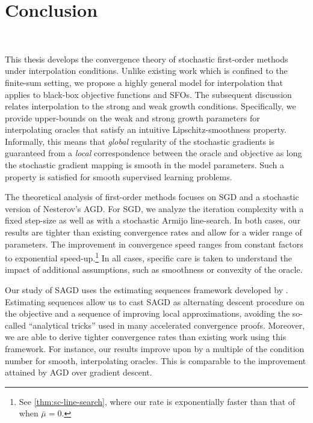 \acresetall 
\chapter{Conclusion}~\label{ch:conclusion}

This thesis develops the convergence theory of stochastic first-order methods under interpolation conditions. 
Unlike existing work which is confined to the finite-sum setting, we propose a highly general model for interpolation that applies to black-box objective functions and \acp{SFO}. 
The subsequent discussion relates interpolation to the strong and weak growth conditions.
Specifically, we provide upper-bounds on the weak and strong growth parameters for interpolating oracles that satisfy an intuitive Lipschitz-smoothness property. 
Informally, this means that \emph{global} regularity of the stochastic gradients is guaranteed from a \emph{local} correspondence between the oracle and objective as long the stochastic gradient mapping is smooth in the model parameters. 
Such a property is satisfied for smooth supervised learning problems. 

The theoretical analysis of first-order methods focuses on \ac{SGD} and a stochastic version of Nesterov's \acl{AGD}. 
For \ac{SGD}, we analyze the iteration complexity with a fixed step-size as well as with a stochastic Armijo line-search.
In both cases, our results are tighter than existing convergence rates and allow for a wider range of parameters.
The improvement in convergence speed ranges from constant factors to exponential speed-up.\footnote{See \autoref{thm:sc-line-search}, where our rate is exponentially faster than that of \citet{vaswani2019painless} when \( \bar \mu = 0 \).} 
In all cases, specific care is taken to understand the impact of additional assumptions, such as smoothness or convexity of the oracle.

Our study of \ac{SAGD} uses the estimating sequences framework developed by \citet{nesterov2004lectures}.
Estimating sequences allow us to cast \ac{SAGD} as alternating descent procedure on the objective and a sequence of improving local approximations, avoiding the so-called ``analytical tricks'' used in many accelerated convergence proofs. 
Moreover, we are able to derive tighter convergence rates than existing work using this framework. 
For instance, our results improve upon \citet{vaswani2019fast} by a multiple of the condition number for smooth, interpolating oracles.
This is comparable to the improvement attained by \acl{AGD} over gradient descent. 

